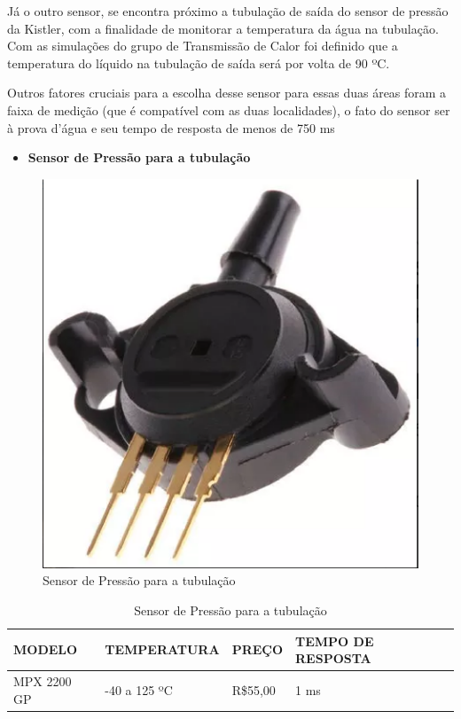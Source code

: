 Já o outro sensor, se encontra próximo a tubulação de saída do sensor de pressão da Kistler, com a finalidade de monitorar a temperatura da água na tubulação. Com as simulações do grupo de Transmissão de Calor foi definido que a temperatura do líquido na tubulação de saída será por volta de 90 ºC.

Outros fatores cruciais para a escolha desse sensor para essas duas áreas foram a faixa de medição (que é compatível com as duas localidades), o fato do sensor ser à prova d’água e seu tempo de resposta de menos de 750 ms

\begin{itemize}
    \item \textbf{Sensor de Pressão para a tubulação}
\end{itemize}
\begin{figure}[!htb]                  
	\centering                          
	\includegraphics[scale=0.3]{figuras/Figura_5.eps}
	\caption{ Sensor de Pressão para a tubulação}             
\end{figure}

\begin{table}[!h]
    \centering
    \begin{tabular}{|p{3cm}|p{5cm}|p{3cm}|p{3cm}|}
    \hline
    \textbf{MODELO} & \textbf{TEMPERATURA}    & \textbf{PREÇO} & \textbf{TEMPO DE RESPOSTA} \\ \hline
    MPX 2200 GP      & -40 a 125 ºC &  R\$55,00 & 1 ms  \\ \hline
    \end{tabular}
    \caption{Sensor de Pressão para a tubulação}
    \end{table}

